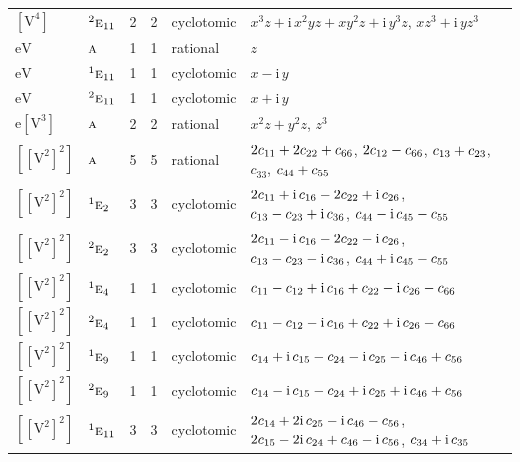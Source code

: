 \documentclass[10pt,a4paper]{article}
\numberwithin{equation}{section}
\newcommand{\irr}[1]{\text{\normalfont\scshape #1}}
\newcommand{\conjpair}[1]{{}^{#1}}
\newcommand{\iunit}{\mathrm{i}}
\newcommand{\jahn}[1]{\mathrm{#1}}
\newlength{\fillwidth}\newlength{\cellwidth}\newlength{\colwidth}
\newcommand{\signbreak}{\penalty100\relax}
\begin{document}
{\begin{longtable}{@{}llrrl>{\RaggedRight\arraybackslash}p{\fillwidth}@{}}
$\jahn{[V^{4}]}$ & $\conjpair{2}\irr{e}_{11}$ & 2 & 2 & cyclotomic & $x^{3}z + \iunit{}\,x^{2}yz + xy^{2}z + \iunit{}\,y^{3}z$, $xz^{3} + \iunit{}\,yz^{3}$\\
$\jahn{eV}$ & $\irr{a}$ & 1 & 1 & rational & $z$\\
$\jahn{eV}$ & $\conjpair{1}\irr{e}_{11}$ & 1 & 1 & cyclotomic & $x - \iunit{}\,y$\\
$\jahn{eV}$ & $\conjpair{2}\irr{e}_{11}$ & 1 & 1 & cyclotomic & $x + \iunit{}\,y$\\
$\jahn{e[V^{3}]}$ & $\irr{a}$ & 2 & 2 & rational & $x^{2}z + y^{2}z$, $z^{3}$\\
$\jahn{[[V^{2}]^{2}]}$ & $\irr{a}$ & 5 & 5 & rational & $2c_{11} +\signbreak 2c_{22} +\signbreak c_{66}$, $2c_{12} -\signbreak c_{66}$, $c_{13} +\signbreak c_{23}$, $c_{33}$, $c_{44} +\signbreak c_{55}$\\
$\jahn{[[V^{2}]^{2}]}$ & $\conjpair{1}\irr{e}_{2}$ & 3 & 3 & cyclotomic & $2c_{11} +\signbreak \iunit{}\,c_{16} -\signbreak 2c_{22} +\signbreak \iunit{}\,c_{26}$, $c_{13} -\signbreak c_{23} +\signbreak \iunit{}\,c_{36}$, $c_{44} -\signbreak \iunit{}\,c_{45} -\signbreak c_{55}$\\
$\jahn{[[V^{2}]^{2}]}$ & $\conjpair{2}\irr{e}_{2}$ & 3 & 3 & cyclotomic & $2c_{11} -\signbreak \iunit{}\,c_{16} -\signbreak 2c_{22} -\signbreak \iunit{}\,c_{26}$, $c_{13} -\signbreak c_{23} -\signbreak \iunit{}\,c_{36}$, $c_{44} +\signbreak \iunit{}\,c_{45} -\signbreak c_{55}$\\
$\jahn{[[V^{2}]^{2}]}$ & $\conjpair{1}\irr{e}_{4}$ & 1 & 1 & cyclotomic & $c_{11} -\signbreak c_{12} +\signbreak \iunit{}\,c_{16} +\signbreak c_{22} -\signbreak \iunit{}\,c_{26} -\signbreak c_{66}$\\
$\jahn{[[V^{2}]^{2}]}$ & $\conjpair{2}\irr{e}_{4}$ & 1 & 1 & cyclotomic & $c_{11} -\signbreak c_{12} -\signbreak \iunit{}\,c_{16} +\signbreak c_{22} +\signbreak \iunit{}\,c_{26} -\signbreak c_{66}$\\
$\jahn{[[V^{2}]^{2}]}$ & $\conjpair{1}\irr{e}_{9}$ & 1 & 1 & cyclotomic & $c_{14} +\signbreak \iunit{}\,c_{15} -\signbreak c_{24} -\signbreak \iunit{}\,c_{25} -\signbreak \iunit{}\,c_{46} +\signbreak c_{56}$\\
$\jahn{[[V^{2}]^{2}]}$ & $\conjpair{2}\irr{e}_{9}$ & 1 & 1 & cyclotomic & $c_{14} -\signbreak \iunit{}\,c_{15} -\signbreak c_{24} +\signbreak \iunit{}\,c_{25} +\signbreak \iunit{}\,c_{46} +\signbreak c_{56}$\\
$\jahn{[[V^{2}]^{2}]}$ & $\conjpair{1}\irr{e}_{11}$ & 3 & 3 & cyclotomic & $2c_{14} +\signbreak 2\iunit{}\,c_{25} -\signbreak \iunit{}\,c_{46} -\signbreak c_{56}$, $2c_{15} -\signbreak 2\iunit{}\,c_{24} +\signbreak c_{46} -\signbreak \iunit{}\,c_{56}$, $c_{34} +\signbreak \iunit{}\,c_{35}$\\

\end{longtable}}
\end{document}
